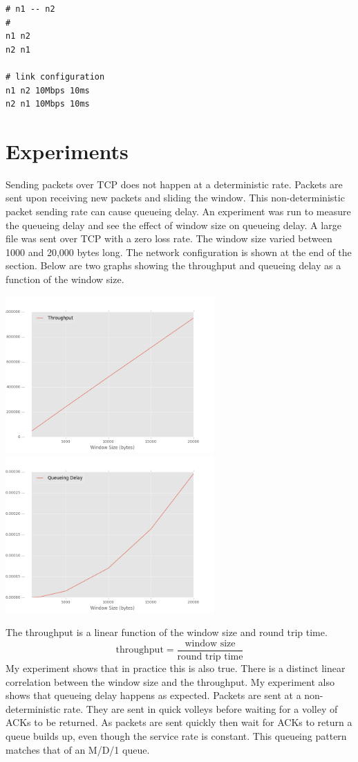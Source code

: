 \documentclass[fleqn,11pt]{article}
\begin{document}
\begin{lstlisting}[title={Network Configuration for Fast Retransmit}]
# n1 -- n2
#
n1 n2
n2 n1

# link configuration
n1 n2 10Mbps 10ms
n2 n1 10Mbps 10ms
\end{lstlisting}


\section{Experiments}

Sending packets over TCP does not happen at a deterministic rate. 
Packets are sent upon receiving new packets and sliding the window.
This non-deterministic packet sending rate can cause queueing delay.
An experiment was run to measure the queueing delay and see the effect of window size on queueing delay.
A large file was sent over TCP with a zero loss rate.
The window size varied between 1000 and 20,000 bytes long. 
The network configuration is shown at the end of the section.
Below are two graphs showing the throughput and queueing delay as a function of the window size.

\includegraphics[width=8cm]{throughput.png}
\includegraphics[width=8cm]{delay.png}

The throughput is a linear function of the window size and round trip time. 
\[\text{throughput} = \frac{\text{window  size}}{\text{round trip time}} \]
My experiment shows that in practice this is also true. There is a distinct linear correlation between the window size and the throughput.
My experiment also shows that queueing delay happens as expected.
Packets are sent at a non-deterministic rate.
They are sent in quick volleys before waiting for a volley of ACKs to be returned.
As packets are sent quickly then wait for ACKs to return a queue builds up, even though the service rate is constant.
This queueing pattern matches that of an M/D/1 queue. 
\end{document}
